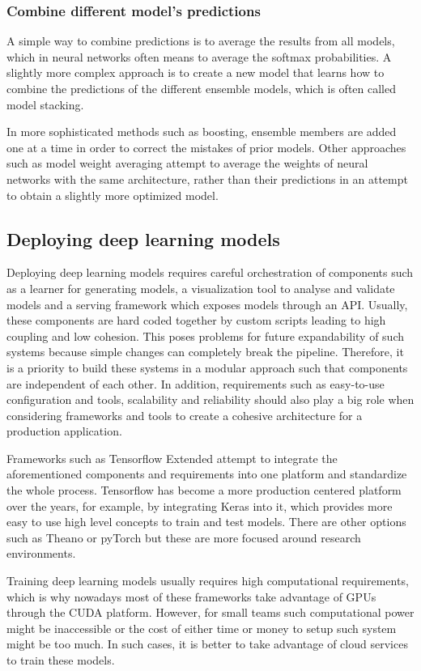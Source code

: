 \subsubsection{Combine different model's predictions}
    A simple way to combine predictions is to average the results from all models, which in neural networks often means to average the softmax probabilities. A slightly more complex approach is to create a new model that learns how to combine the predictions of the different ensemble models, which is often called model stacking. \par
    In more sophisticated methods such as boosting, ensemble members are added one at a time in order to correct the mistakes of prior models. Other approaches such as model weight averaging \cite{?} attempt to average the weights of neural networks with the same architecture, rather than their predictions in an attempt to obtain a slightly more optimized model. \par 
    
\subsection{Deploying deep learning models}
    Deploying deep learning models requires careful orchestration of components such as a learner for generating models, a visualization tool to analyse and validate models and a serving framework which exposes models through an API. Usually, these components are hard coded together by custom scripts leading to high coupling and low cohesion. This poses problems for future expandability of such systems because simple changes can completely break the pipeline. Therefore, it is a priority to build these systems in a modular approach such that components are independent of each other. In addition, requirements such as easy-to-use configuration and tools, scalability and reliability should also play a big role when considering frameworks and tools to create a cohesive architecture for a production application. \par
    Frameworks such as Tensorflow Extended\cite{Baylor2017} attempt to integrate the aforementioned components and requirements into one platform and standardize the whole process. Tensorflow has become a more production centered platform over the years, for example, by integrating Keras\cite{chollet2015keras} into it, which provides more easy to use high level concepts to train and test models. There are other options such as Theano\cite{Bastien} or pyTorch\cite{pytorch} but these are more focused around research environments. \par   
    Training deep learning models usually requires high computational requirements, which is why nowadays most of these frameworks take advantage of GPUs through the CUDA platform. However, for small teams such computational power might be inaccessible or the cost of either time or money to setup such system might be too much. In such cases, it is better to take advantage of cloud services to train these models.  
    
